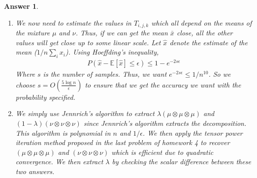 \documentclass[12pt]{article}
\theoremstyle{colon}
\newtheorem*{answer}{Answer}
\begin{document}
\begin{answer}
\begin{enumerate}[label=\arabic*)]
    \item We now need to estimate the values in $T_{i,j,k}$ which all depend on the means of the mixture $\mu$ and $\nu$. Thus, if we can get the mean $\bar{x}$ close, all the other values will get close up to some linear scale. Let $\widehat{x}$ denote the estimate of the mean ($1/n \sum_i x_i$). Using Hoeffding's inequality,
      \begin{gather*}
        P( \widehat{x} - \mathbb{E}[\widehat{x}] \leq \epsilon) \leq 1 - e^{-2 s \epsilon}
      \end{gather*}
      Where $s$ is the number of samples. Thus, we want $e^{-2 s \epsilon} \leq 1/n^{10}$. So we choose $s = O(\frac{5 \log n}{\epsilon})$ to ensure that we get the accuracy we want with the probability specified.

    \item We simply use Jennrich's algorithm to extract $\lambda (\mu \otimes \mu \otimes \mu)$ and $(1-\lambda) (\nu \otimes \nu \otimes \nu)$ since Jennrich's algorithm extracts the decomposition. This algorithm is polynomial in $n$ and $1/\epsilon$. We then apply the tensor power iteration method proposed in the last problem of homework 4 to recover $(\mu \otimes \mu \otimes \mu)$ and $(\nu \otimes \nu \otimes \nu)$ which is efficient due to quadratic convergence. We then extract $\lambda$ by checking the scalar difference between these two answers.
  \end{enumerate}
\end{answer}
\end{document}
